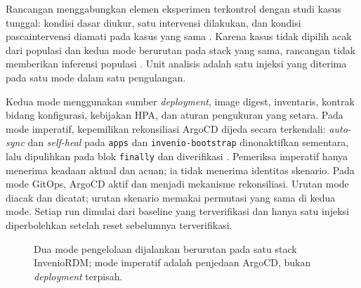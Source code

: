 Rancangan menggabungkan elemen eksperimen terkontrol dengan studi kasus tunggal: kondisi dasar diukur, satu intervensi dilakukan, dan kondisi pascaintervensi diamati pada kasus yang sama \citep{wohlin2012experimentation,runeson2009case}. Karena kasus tidak dipilih acak dari populasi dan kedua mode berurutan pada stack yang sama, rancangan tidak memberikan inferensi populasi \citep{cook1979quasi}. Unit analisis adalah satu injeksi yang diterima pada satu mode dalam satu pengulangan.

Kedua mode menggunakan sumber \textit{deployment}, image digest, inventaris, kontrak bidang konfigurasi, kebijakan HPA, dan aturan pengukuran yang setara. Pada mode imperatif, kepemilikan rekonsiliasi ArgoCD dijeda secara terkendali: \textit{auto-sync} dan \textit{self-heal} pada \texttt{apps} dan \texttt{invenio-bootstrap} dinonaktifkan sementara, lalu dipulihkan pada blok \texttt{finally} dan diverifikasi \citep{argocd2025sync}. Pemeriksa imperatif hanya menerima keadaan aktual dan acuan; ia tidak menerima identitas skenario. Pada mode GitOps, ArgoCD aktif dan menjadi mekanisme rekonsiliasi. Urutan mode diacak dan dicatat; urutan skenario memakai permutasi yang sama di kedua mode. Setiap run dimulai dari baseline yang terverifikasi dan hanya satu injeksi diperbolehkan setelah reset sebelumnya terverifikasi.

\begin{figure}[H]
  \centering
  \caption{Dua mode pengelolaan dijalankan berurutan pada satu stack InvenioRDM; mode imperatif adalah penjedaan ArgoCD, bukan \textit{deployment} terpisah.}
  \label{fig:arsitektur-eksperimen}
\end{figure}

